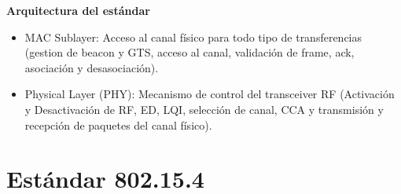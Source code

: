 \documentclass[aspectratio=169]{beamer}
\begin{document}
\begin{frame}{\textbf{Arquitectura del estándar}}

\begin{minipage}[c]{1.0\linewidth}
	
	\begin{minipage}[c]{0.6\linewidth}
		\begin{itemize}
			\item MAC Sublayer: Acceso al canal físico para todo tipo de transferencias (gestion de beacon y GTS, acceso al canal, validación de frame, ack, asociación y desasociación). 
			\vspace{10px}
			\item Physical Layer (PHY): Mecanismo de control del transceiver RF (Activación y Desactivación de RF, ED, LQI, selección de canal, CCA y transmisión y recepción de paquetes del canal físico). 
			\vspace{10px}
	  	\end{itemize}	
	  \end{minipage}

	  \begin{minipage}[c]{0.35\linewidth}
		\begin{figure}[H]
		\end{figure}	  	  	
	  \end{minipage}
	\end{minipage}

\end{frame}

\section{Estándar 802.15.4}
\end{document}
